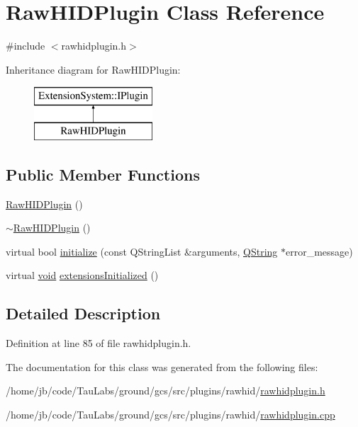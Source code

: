 \hypertarget{class_raw_h_i_d_plugin}{\section{\-Raw\-H\-I\-D\-Plugin \-Class \-Reference}
\label{class_raw_h_i_d_plugin}
}


{\ttfamily \#include $<$rawhidplugin.\-h$>$}

\-Inheritance diagram for \-Raw\-H\-I\-D\-Plugin\-:\begin{figure}[H]
\begin{center}
\leavevmode
\includegraphics[height=2.000000cm]{class_raw_h_i_d_plugin}
\end{center}
\end{figure}
\subsection*{\-Public \-Member \-Functions}
\begin{DoxyCompactItemize}
\item 
\hyperlink{group___raw_h_i_d_plugin_gab33af7d70867d692cd24d8f740449278}{\-Raw\-H\-I\-D\-Plugin} ()
\item 
\hyperlink{group___raw_h_i_d_plugin_ga0201928dc19d45a2e3771f6631af7fd5}{$\sim$\-Raw\-H\-I\-D\-Plugin} ()
\item 
virtual bool \hyperlink{group___raw_h_i_d_plugin_ga52bbfe9d4f2cd93a959bdd723438e522}{initialize} (const \-Q\-String\-List \&arguments, \hyperlink{group___u_a_v_objects_plugin_gab9d252f49c333c94a72f97ce3105a32d}{\-Q\-String} $\ast$error\-\_\-message)
\item 
virtual \hyperlink{group___u_a_v_objects_plugin_ga444cf2ff3f0ecbe028adce838d373f5c}{void} \hyperlink{group___raw_h_i_d_plugin_ga59b1e6d264de04d48bb83b823f91a5fe}{extensions\-Initialized} ()
\end{DoxyCompactItemize}


\subsection{\-Detailed \-Description}


\-Definition at line 85 of file rawhidplugin.\-h.



\-The documentation for this class was generated from the following files\-:\begin{DoxyCompactItemize}
\item 
/home/jb/code/\-Tau\-Labs/ground/gcs/src/plugins/rawhid/\hyperlink{rawhidplugin_8h}{rawhidplugin.\-h}\item 
/home/jb/code/\-Tau\-Labs/ground/gcs/src/plugins/rawhid/\hyperlink{rawhidplugin_8cpp}{rawhidplugin.\-cpp}\end{DoxyCompactItemize}
